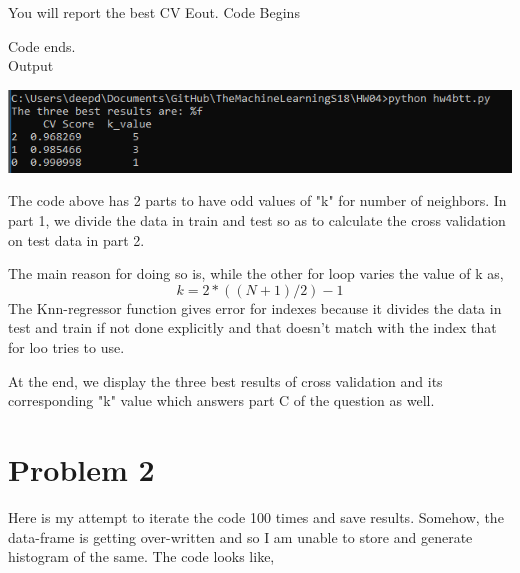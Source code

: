 \documentclass[10pt]{article}         %
\begin{document}
You will report the best CV Eout.
Code Begins

Code ends. 
\\Output\\
\begin{center}
\includegraphics[scale=0.6]{hw4q1partc.png}
\end{center}
The code above has 2 parts to have odd values of "k" for number of neighbors.
In part 1, we divide the data in train and test so as to calculate the cross validation on test data in part 2. 

The main reason for doing so is, while the other for loop varies the value of k as,
$$k = 2 * ((N+1)/2) - 1$$
The Knn-regressor function gives error for indexes because it divides the data in test and train if not done explicitly and that doesn't match with the index that for loo tries to use. 

At the end, we display the three best results of cross validation and its corresponding "k" value which answers part C of the question as well.

\section{Problem 2}
Here is my attempt to iterate the code 100 times and save results. Somehow, the data-frame is getting over-written and so I am unable to store and generate histogram of the same. 
The code looks like, 

\end{document}
